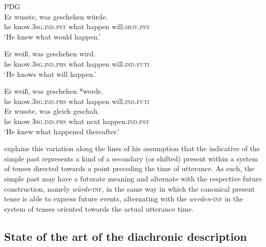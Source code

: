 \documentclass[output=paper,colorlinks,citecolor=brown]{langscibook}
\begin{document}
\ea \label{ex:petrova_chen:petrova_chen:pdg3} PDG \\

    \ea \label{ex:petrova_chen:petrova_chen:pdg3a} 
    \gll Er wusste, was geschehen würde.\\
    he know.\textsc{3sg.ind.pst} what happen will.\textsc{sbjv.pst}\\
    \glt ‘He knew what would happen.’

    \ex \label{ex:petrova_chen:petrova_chen:pdg3b} 
    \gll Er weiß, was geschehen wird.\\
    he know.\textsc{3sg.ind.prs} what happen will.\textsc{ind.futi}\\
    \glt ‘He knows what will happen.’

    \ex \label{ex:petrova_chen:petrova_chen:pdg3c} 
    \gll Er weiß, was geschehen *werde.\\
    he know.\textsc{3sg.ind.prs} what happen will.\textsc{ind.futi}\\
    
    \ex \label{ex:petrova_chen:petrova_chen:pdg3d} 
    \gll Er wusste, was gleich geschah.\\
    he know.\textsc{3sg.ind.prs} what next happen.\textsc{ind.pst}\\
    \glt ‘He knew what happened thereafter.’
    \z 
\z

\citet{Thieroff1992} explains this variation along the lines of his assumption that the indicative of the simple past represents a kind of a secondary (or shifted) present within a system of tenses directed towards a point preceding the time of utterance. As such, the simple past may have a futurate meaning and alternate with the respective future construction, namely \textit{würde}-\textsc{inf}, in the same way in which the canonical present tense is able to express future events, alternating with the \textit{werden}-\textsc{inf} in the system of tenses oriented towards the actual utterance time.



\subsection{State of the art of the diachronic description} \label{section 2.2}
\end{document}
